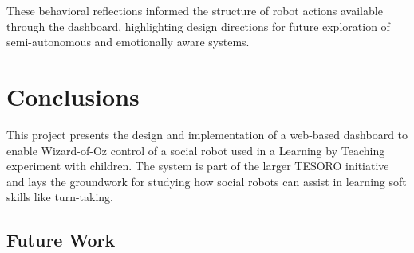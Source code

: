 \documentclass[a4paper]{usiinfbachelorproject}
\begin{document}
These behavioral reflections informed the structure of robot actions available through the dashboard, highlighting design directions for future exploration of semi-autonomous and emotionally aware systems.

\newpage

\section{\textbf{Conclusions}}\label{sec:conclusions}
This project presents the design and implementation of a web-based dashboard to enable Wizard-of-Oz control of a social robot used in a Learning by Teaching experiment with children.
The system is part of the larger TESORO initiative and lays the groundwork for studying how social robots can assist in learning soft skills like turn-taking.

\subsection{\textbf{Future Work}}




\end{document}
